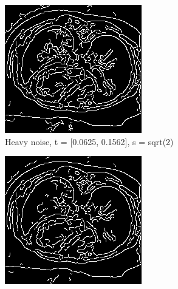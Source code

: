 \begin{figure}[H]
  \centering
  
  \begin{subfigure}{.5\textwidth}
    \centering
    \includegraphics[width=.9\textwidth]{./edgedetection/canny_heavy_noise/h_noise_def}
    \caption{Heavy noise, t = [0.0625, 0.1562], s = sqrt(2)}
    \label{fig:h_noise_def}
  \end{subfigure}%
      \begin{subfigure}{.5\textwidth}
    \centering
    \includegraphics[width=.9\textwidth]{./edgedetection/canny_heavy_noise/h_noise_insens_l_thres}

\end{subfigure}
\end{figure}
